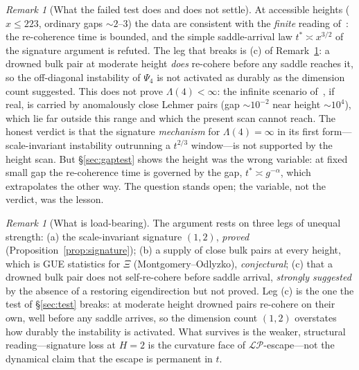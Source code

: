 \documentclass[11pt,reqno]{amsart}
\theoremstyle{plain}
\theoremstyle{definition}
\theoremstyle{remark}
\newtheorem{remark}[theorem]{Remark}
\newcommand{\LP}{\mathcal{LP}}
\begin{document}
\begin{remark}[What the failed test does and does not settle]
\label{rem:test}
At accessible heights ($x\le223$, ordinary gaps $\sim2$--$3$) the data
are consistent with the \emph{finite} reading of~\cite{FontesIBM}: the
re-coherence time is bounded, and the simple saddle-arrival law
$t^\ast\asymp x^{3/2}$ of the signature argument is refuted. The leg that
breaks is (c) of Remark~\ref{rem:loadbearing}: a drowned bulk pair at
moderate height \emph{does} re-cohere before any saddle reaches it, so
the off-diagonal instability of $\Psi_4$ is not activated as durably as
the dimension count suggested. This does not prove $\Lambda(4)<\infty$:
the infinite scenario of~\cite{FontesRMT}, if real, is carried by
anomalously close Lehmer pairs (gap $\sim10^{-2}$ near height $\sim10^4$),
which lie far outside this range and which the present scan cannot reach.
The honest verdict is that the signature \emph{mechanism} for
$\Lambda(4)=\infty$ in its first form---scale-invariant instability
outrunning a $t^{2/3}$ window---is not supported by the height scan. But
\S\ref{sec:gaptest} shows the height was the wrong variable: at fixed
small gap the re-coherence time is governed by the gap, $t^\ast\asymp
g^{-\alpha}$, which extrapolates the other way. The question stands open;
the variable, not the verdict, was the lesson.
\end{remark}

\begin{remark}[What is load-bearing]\label{rem:loadbearing}
The argument rests on three legs of unequal strength: (a) the
scale-invariant signature $(1,2)$, \emph{proved}
(Proposition~\ref{prop:signature}); (b) a supply of close bulk pairs at
every height, which is GUE statistics for $\Xi$ (Montgomery--Odlyzko),
\emph{conjectural}; (c) that a drowned bulk pair does not self-re-cohere
before saddle arrival, \emph{strongly suggested} by the absence of a
restoring eigendirection but not proved. Leg (c) is the one the test of
\S\ref{sec:test} breaks: at moderate height drowned pairs re-cohere on
their own, well before any saddle arrives, so the dimension count
$(1,2)$ overstates how durably the instability is activated. What
survives is the weaker, structural reading---signature loss at $H=2$ is
the curvature face of $\LP$-escape---not the dynamical claim that the
escape is permanent in $t$.
\end{remark}
\end{document}

